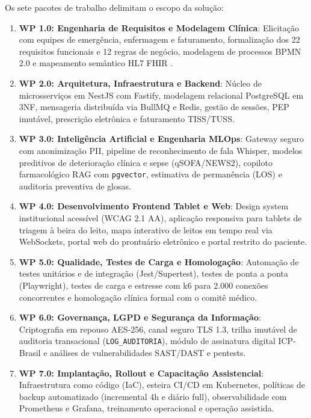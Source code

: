 Os sete pacotes de trabalho delimitam o escopo da solução:
\begin{enumerate}[leftmargin=*]
    \item \textbf{WP 1.0: Engenharia de Requisitos e Modelagem Clínica}: Elicitação com equipes de emergência, enfermagem e faturamento, formalização dos 22 requisitos funcionais e 12 regras de negócio, modelagem de processos BPMN 2.0 e mapeamento semântico HL7 FHIR \cite{hl7_fhir:2019}.
    \item \textbf{WP 2.0: Arquitetura, Infraestrutura e Backend}: Núcleo de microsserviços em NestJS com Fastify, modelagem relacional PostgreSQL em 3NF, mensageria distribuída via BullMQ e Redis, gestão de sessões, PEP imutável, prescrição eletrônica e faturamento TISS/TUSS.
    \item \textbf{WP 3.0: Inteligência Artificial e Engenharia MLOps}: Gateway seguro com anonimização PII, pipeline de reconhecimento de fala Whisper, modelos preditivos de deterioração clínica e sepse (qSOFA/NEWS2), copiloto farmacológico RAG com \texttt{pgvector}, estimativa de permanência (LOS) e auditoria preventiva de glosas.
    \item \textbf{WP 4.0: Desenvolvimento Frontend Tablet e Web}: Design system institucional acessível (WCAG 2.1 AA), aplicação responsiva para tablets de triagem à beira do leito, mapa interativo de leitos em tempo real via WebSockets, portal web do prontuário eletrônico e portal restrito do paciente.
    \item \textbf{WP 5.0: Qualidade, Testes de Carga e Homologação}: Automação de testes unitários e de integração (Jest/Supertest), testes de ponta a ponta (Playwright), testes de carga e estresse com k6 para 2.000 conexões concorrentes e homologação clínica formal com o comitê médico.
    \item \textbf{WP 6.0: Governança, LGPD e Segurança da Informação}: Criptografia em repouso AES-256, canal seguro TLS 1.3, trilha imutável de auditoria transacional (\texttt{LOG\_AUDITORIA}), módulo de assinatura digital ICP-Brasil e análises de vulnerabilidades SAST/DAST e pentests.
    \item \textbf{WP 7.0: Implantação, Rollout e Capacitação Assistencial}: Infraestrutura como código (IaC), esteira CI/CD em Kubernetes, políticas de backup automatizado (incremental 4h e diário full), observabilidade com Prometheus e Grafana, treinamento operacional e operação assistida.
\end{enumerate}

